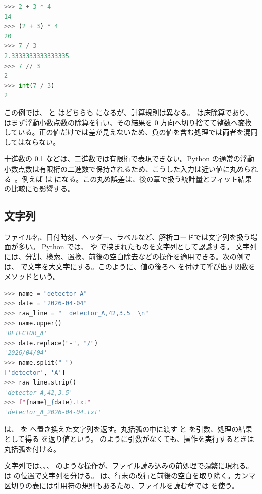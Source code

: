 \begin{lstlisting}[language=Python, numbers=none, xleftmargin=2\zw]
>>> 2 + 3 * 4
14
>>> (2 + 3) * 4
20
>>> 7 / 3
2.3333333333333335
>>> 7 // 3
2
>>> int(7 / 3)
2
\end{lstlisting}

この例では、 と  はどちらも  になるが、計算規則は異なる。\code{//} は床除算であり、 はまず浮動小数点数の除算を行い、その結果を 0 方向へ切り捨てて整数へ変換している。正の値だけでは差が見えないため、負の値を含む処理では両者を混同してはならない。

十進数の 0.1 などは、二進数では有限桁で表現できない。Python の通常の浮動小数点数は有限桁の二進数で保持されるため、こうした入力は近い値に丸められる~\cite{python_floatingpoint}。例えば  は  になる。この丸め誤差は、後の章で扱う統計量とフィット結果の比較にも影響する。

\subsection{文字列}

ファイル名、日付時刻、ヘッダー、ラベルなど、解析コードでは文字列を扱う場面が多い。
Python では、 や  で挟まれたものを文字列として認識する。
文字列には、分割、検索、置換、前後の空白除去などの操作を適用できる。次の例では、 で文字を大文字にする。このように、値の後ろへ  を付けて呼び出す関数をメソッドという。

\begin{lstlisting}[language=Python, numbers=none, xleftmargin=2\zw]
>>> name = "detector_A"
>>> date = "2026-04-04"
>>> raw_line = "  detector_A,42,3.5  \n"
>>> name.upper()
'DETECTOR_A'
>>> date.replace("-", "/")
'2026/04/04'
>>> name.split("_")
['detector', 'A']
>>> raw_line.strip()
'detector_A,42,3.5'
>>> f"{name}_{date}.txt"
'detector_A_2026-04-04.txt'
\end{lstlisting}

 は、\code{-} を \code{/} へ置き換えた文字列を返す。丸括弧の中に渡す  と  を引数、処理の結果として得る  を返り値という。 のように引数がなくても、操作を実行するときは丸括弧を付ける。

文字列では、、、 のような操作が、ファイル読み込みの前処理で頻繁に現れる。 は \code{\_} の位置で文字列を分ける。 は、行末の改行と前後の空白を取り除く。カンマ区切りの表には引用符の規則もあるため、ファイルを読む章では  を使う。

